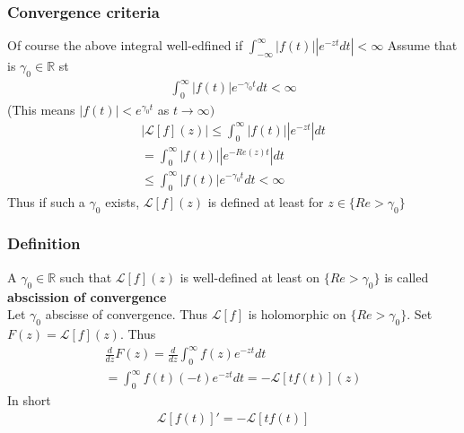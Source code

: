 \subsubsection{Convergence criteria}
Of course the above integral well-edfined if $\int_{-\infty}^\infty |f(t)||e^{-zt}dt| < \infty$ Assume that is $\gamma_0 \in \mathbb{R}$ st
\begin{align*}
    \int_0^\infty |f(t)|e^{-\gamma_0t}dt < \infty 
\end{align*}
(This means $|f(t)| < e^{\gamma_0 t}$ as $t \rightarrow \infty)$
\begin{align*}
    |\mathcal{L}[f](z)| \leq \int_0^\infty |f(t)||e^{-zt}|dt \\
    = \int_0^\infty |f(t)||e^{-Re(z) t}|dt \\
    \leq \int_0^\infty |f(t)|e^{-\gamma_0t}dt < \infty 
\end{align*}
Thus if such a $\gamma_0$ exists, $\mathcal{L}[f](z)$ is defined at least for $z \in \{Re > \gamma_0\}$
\subsubsection{Definition} A $\gamma_0 \in \mathbb{R}$ such that $\mathcal{L}[f](z)$ is well-defined at least on $\{Re > \gamma_0\}$ is called \textbf{abscission of convergence} \\
Let $\gamma_0$ abscisse of convergence. Thus $\mathcal{L}[f]$ is holomorphic on $\{Re > \gamma_0\}$. Set $F(z) = \mathcal{L}[f](z)$. Thus 
\begin{align*}
    \frac{d}{dz}F(z) = \frac{d}{dz}\int_0^\infty f(z)e^{-zt}dt \\
    = \int_0^\infty f(t) (-t)e^{-zt}dt = - \mathcal{L}[tf(t)](z)
\end{align*}
In short 
\begin{align*}
    \mathcal{L}[f(t)]' = - \mathcal{L}[tf(t)]
\end{align*}